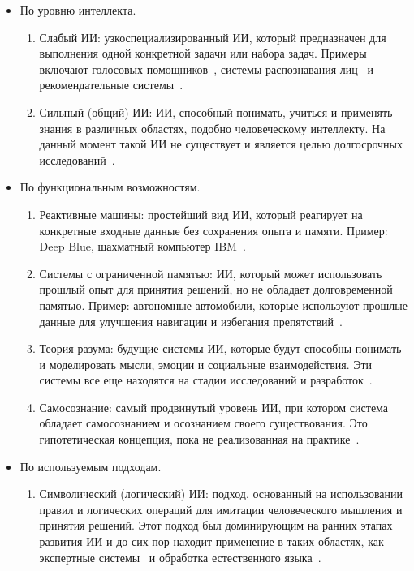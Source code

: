 \begin{itemize}[label=\textbullet]
    \item По уровню интеллекта. \begin{enumerate}
        \item Слабый ИИ: узкоспециализированный ИИ, который предназначен для выполнения одной конкретной задачи или набора задач. Примеры включают голосовых помощников~\cite{yang, huang, liu}, системы распознавания лиц~\cite{jha, ali, adjabi} и рекомендательные системы~\cite{azeroual, roy, zhang}.
        \item Сильный (общий) ИИ: ИИ, способный понимать, учиться и применять знания в различных областях, подобно человеческому интеллекту. На данный момент такой ИИ не существует и является целью долгосрочных исследований~\cite{buttazzo, butz, hoffmann}.
    \end{enumerate}
    \item По функциональным возможностям. \begin{enumerate}
        \item Реактивные машины: простейший вид ИИ, который реагирует на конкретные входные данные без сохранения опыта и памяти. Пример: Deep Blue, шахматный компьютер IBM~\cite{newborn}.
        \item Системы с ограниченной памятью: ИИ, который может использовать прошлый опыт для принятия решений, но не обладает долговременной памятью. Пример: автономные автомобили, которые используют прошлые данные для улучшения навигации и избегания препятствий~\cite{lai, padmaja, mahmoud, liy}.
        \item Теория разума: будущие системы ИИ, которые будут способны понимать и моделировать мысли, эмоции и социальные взаимодействия. Эти системы все еще находятся на стадии исследований и разработок~\cite{cuzzolin, williams}.
        \item Самосознание: самый продвинутый уровень ИИ, при котором система обладает самосознанием и осознанием своего существования. Это гипотетическая концепция, пока не реализованная на практике~\cite{chella, li, butlin}.
    \end{enumerate}
    \item По используемым подходам. \begin{enumerate}
        \item Символический (логический) ИИ: подход, основанный на использовании правил и логических операций для имитации человеческого мышления и принятия решений. Этот подход был доминирующим на ранних этапах развития ИИ и до сих пор находит применение в таких областях, как экспертные системы~\cite{calegari, belle, luo} и обработка естественного языка~\cite{hamilton, liuz, aithal}.

\end{enumerate}
\end{itemize}
